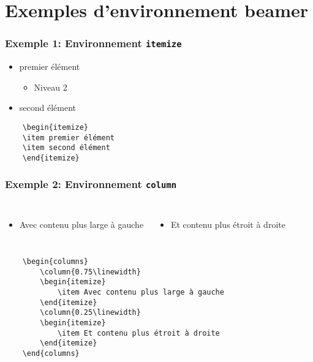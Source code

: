 \documentclass[t,aspectratio=169]{beamer}
\begin{document}
\section{Exemples d'environnement beamer}

\begin{frame}[fragile]
    \frametitle{Exemple 1: Environnement \texttt{itemize}}
\begin{itemize}
    \item premier élément 
        \begin{itemize}
            \item Niveau 2
        \end{itemize}
    \item second élément
\end{itemize}
\begin{verbatim}
    \begin{itemize}
    \item premier élément 
    \item second élément
    \end{itemize}
\end{verbatim}
\end{frame}

\begin{frame}[fragile]
    \frametitle{Exemple 2: Environnement \texttt{column}}
    \begin{columns}
        \begin{itemize}
            \item Avec contenu plus large à gauche
        \end{itemize}
        \begin{itemize}
            \item Et contenu plus étroit à droite 
        \end{itemize}
    \end{columns}
{\scriptsize
\begin{verbatim}
    \begin{columns}
        \column{0.75\linewidth}
        \begin{itemize}
            \item Avec contenu plus large à gauche
        \end{itemize}
        \column{0.25\linewidth}
        \begin{itemize}
            \item Et contenu plus étroit à droite 
        \end{itemize}
    \end{columns}
\end{verbatim}
}
\end{frame}
\end{document}
